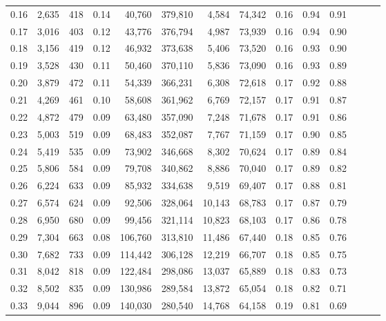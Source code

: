 \begin{tabular}{rrrrrrrrrrrrrr}
0.16 &   2,635 &    418 &  0.14 &   40,760 &  379,810 &   4,584 &  74,342 &  0.16 &  0.94 &      0.91 \\
0.17 &   3,016 &    403 &  0.12 &   43,776 &  376,794 &   4,987 &  73,939 &  0.16 &  0.94 &      0.90 \\
0.18 &   3,156 &    419 &  0.12 &   46,932 &  373,638 &   5,406 &  73,520 &  0.16 &  0.93 &      0.90 \\
0.19 &   3,528 &    430 &  0.11 &   50,460 &  370,110 &   5,836 &  73,090 &  0.16 &  0.93 &      0.89 \\
0.20 &   3,879 &    472 &  0.11 &   54,339 &  366,231 &   6,308 &  72,618 &  0.17 &  0.92 &      0.88 \\
0.21 &   4,269 &    461 &  0.10 &   58,608 &  361,962 &   6,769 &  72,157 &  0.17 &  0.91 &      0.87 \\
0.22 &   4,872 &    479 &  0.09 &   63,480 &  357,090 &   7,248 &  71,678 &  0.17 &  0.91 &      0.86 \\
0.23 &   5,003 &    519 &  0.09 &   68,483 &  352,087 &   7,767 &  71,159 &  0.17 &  0.90 &      0.85 \\
0.24 &   5,419 &    535 &  0.09 &   73,902 &  346,668 &   8,302 &  70,624 &  0.17 &  0.89 &      0.84 \\
0.25 &   5,806 &    584 &  0.09 &   79,708 &  340,862 &   8,886 &  70,040 &  0.17 &  0.89 &      0.82 \\
0.26 &   6,224 &    633 &  0.09 &   85,932 &  334,638 &   9,519 &  69,407 &  0.17 &  0.88 &      0.81 \\
0.27 &   6,574 &    624 &  0.09 &   92,506 &  328,064 &  10,143 &  68,783 &  0.17 &  0.87 &      0.79 \\
0.28 &   6,950 &    680 &  0.09 &   99,456 &  321,114 &  10,823 &  68,103 &  0.17 &  0.86 &      0.78 \\
0.29 &   7,304 &    663 &  0.08 &  106,760 &  313,810 &  11,486 &  67,440 &  0.18 &  0.85 &      0.76 \\
0.30 &   7,682 &    733 &  0.09 &  114,442 &  306,128 &  12,219 &  66,707 &  0.18 &  0.85 &      0.75 \\
0.31 &   8,042 &    818 &  0.09 &  122,484 &  298,086 &  13,037 &  65,889 &  0.18 &  0.83 &      0.73 \\
0.32 &   8,502 &    835 &  0.09 &  130,986 &  289,584 &  13,872 &  65,054 &  0.18 &  0.82 &      0.71 \\
0.33 &   9,044 &    896 &  0.09 &  140,030 &  280,540 &  14,768 &  64,158 &  0.19 &  0.81 &      0.69 \\

\end{tabular}
